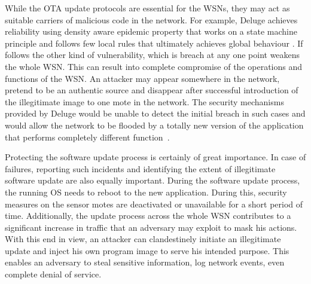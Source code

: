 \documentclass[conference]{IEEEtran}
\begin{document}
While the OTA update protocols are essential for the WSNs, they may act as suitable carriers of malicious code in the network.
For example, Deluge achieves reliability using density aware epidemic property that works on a state machine principle and follows few local rules that ultimately achieves global behaviour \cite{1031506}.
If follows the other kind of vulnerability, which is breach at any one point weakens the whole WSN. 
This can result into complete compromise of the operations and functions of the WSN.
An attacker may appear somewhere in the network, pretend to be an authentic source and disappear after successful introduction of the illegitimate image to one mote in the network. 
The security mechanisms provided by Deluge would be unable to detect the initial breach in such cases and would allow the network to be flooded by a totally new version of the application that performs completely different function~\cite{Karlof:2004:TLL:1031495.1031515}.

Protecting the software update process is certainly of great importance.
In case of failures, reporting such incidents and identifying the extent of illegitimate software update are also equally important.
During the software update process, the running OS needs to reboot to the new application. 
During this, security  measures on the sensor motes are deactivated or unavailable for a short period of time.
Additionally, the update process across the whole WSN contributes to a significant increase in traffic that an adversary may exploit to  mask his actions. 
With this end in view, an attacker can clandestinely initiate an illegitimate update and inject his own program image to serve his intended purpose.
This enables an adversary to steal sensitive information, log network events, even complete denial of service. 
\end{document}
